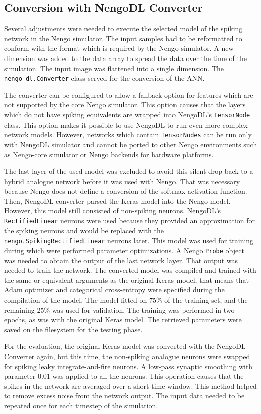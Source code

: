 \subsection{Conversion with NengoDL Converter}
Several adjustments were needed to execute the selected model of the spiking network in the Nengo simulator. The input samples had to be reformatted to conform with the format which is required by the Nengo simulator. A new dimension was added to the data array to spread the data over the time of the simulation. The input image was flattened into a single dimension. The \texttt{nengo\_dl.Converter} class served for the conversion of the ANN. \par
The converter can be configured to allow a fallback option for features which are not supported by the core Nengo simulator. This option causes that the layers which do not have spiking equivalents are wrapped into NengoDL's \texttt{TensorNode} class. This option makes it possible to use NengoDL to run even more complex network models. However, networks which contain \texttt{TensorNodes} can be run only with NengoDL simulator and cannot be ported to other Nengo environments such as Nengo-core simulator or Nengo backends for hardware platforms. \par
The last layer of the used model was excluded to avoid this silent drop back to a hybrid analogue network before it was used with Nengo. That was necessary because Nengo does not define a conversion of the softmax activation function. Then, NengoDL converter parsed the Keras model into the Nengo model. However, this model still consisted of non-spiking neurons. NengoDL's \texttt{RectifiedLinear} neurons were used because they provided an approximation for the spiking neurons and would be replaced with the \texttt{nengo.SpikingRectifiedLinear} neurons later. This model was used for training during which were performed parameter optimizations. A Nengo \texttt{Probe} object was needed to obtain the output of the last network layer. That output was needed to train the network. The converted model was compiled and trained with the same or equivalent arguments as the original Keras model, that means that Adam optimizer and categorical cross-entropy were specified during the compilation of the model. The model fitted on 75\% of the training set, and the remaining 25\% was used for validation. The training was performed in two epochs, as was with the original Keras model. The retrieved parameters were saved on the filesystem for the testing phase. \par
For the evaluation, the original Keras model was converted with the NengoDL Converter again, but this time, the non-spiking analogue neurons were swapped for spiking leaky integrate-and-fire neurons. A low-pass synaptic smoothing with parameter 0.01 was applied to all the neurons. This operation causes that the spikes in the network are averaged over a short time window. This method helped to remove excess noise from the network output. The input data needed to be repeated once for each timestep of the simulation. \par

